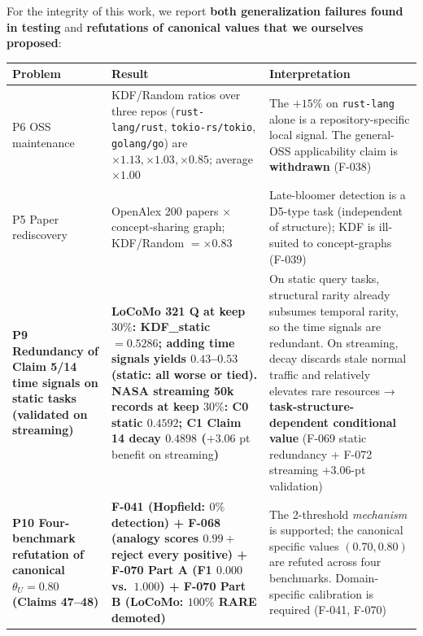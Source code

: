 For the integrity of this work, we report \textbf{both generalization failures found in testing} and \textbf{refutations of canonical values that we ourselves proposed}:

{\def\LTcaptype{none} %
\begin{longtable}[]{@{}
  >{\raggedright\arraybackslash}p{}
  >{\raggedright\arraybackslash}p{}
  >{\raggedright\arraybackslash}p{}@{}}
\toprule\noalign{}
\begin{minipage}[b]{\linewidth}\raggedright
Problem
\end{minipage} & \begin{minipage}[b]{\linewidth}\raggedright
Result
\end{minipage} & \begin{minipage}[b]{\linewidth}\raggedright
Interpretation
\end{minipage} \\
\midrule\noalign{}
\endhead
\bottomrule\noalign{}
\endlastfoot
P6 OSS maintenance & KDF/Random ratios over three repos (\texttt{rust-lang/rust}, \texttt{tokio-rs/tokio}, \texttt{golang/go}) are \(\times 1.13, \times 1.03, \times 0.85\); average \textbf{\(\times 1.00\)} & The \(+15\%\) on \texttt{rust-lang} alone is a repository-specific local signal. The general-OSS applicability claim is \textbf{withdrawn} (F-038) \\
P5 Paper rediscovery & OpenAlex 200 papers × concept-sharing graph; KDF/Random \(= \mathbf{\times 0.83}\) & Late-bloomer detection is a D5-type task (independent of structure); KDF is ill-suited to concept-graphs (F-039) \\
\textbf{P9 Redundancy of Claim 5/14 time signals on static tasks (validated on streaming)} & \textbf{LoCoMo 321 Q at keep \(30\%\): KDF\_static \(= 0.5286\); adding time signals yields \(0.43\)--\(0.53\) (static: all worse or tied). NASA streaming 50k records at keep \(30\%\): C0 static \(0.4592\); C1 Claim 14 decay \(0.4898\) (}\(+3.06\) pt benefit on streaming\textbf{)} & On static query tasks, structural rarity already subsumes temporal rarity, so the time signals are redundant. On streaming, decay discards stale normal traffic and relatively elevates rare resources → \textbf{task-structure-dependent conditional value} (F-069 static redundancy + F-072 streaming \(+3.06\)-pt validation) \\
\textbf{P10 Four-benchmark refutation of canonical \(\theta_U = 0.80\) (Claims 47--48)} & \textbf{F-041 (Hopfield: \(0\%\) detection) + F-068 (analogy scores \(0.99+\) reject every positive) + F-070 Part A (F1 \(0.000\) vs.~\(1.000\)) + F-070 Part B (LoCoMo: \(100\%\) RARE demoted)} & The 2-threshold \emph{mechanism} is supported; the canonical specific values \((0.70, 0.80)\) are refuted across four benchmarks. Domain-specific calibration is required (F-041, F-070) \\
\end{longtable}
}

